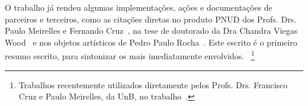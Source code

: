 \documentclass[a4paper, 11pt]{article} %
\begin{document}
O trabalho já rendeu algumas implementações, ações e documentações de parceiros e terceiros, como as citações diretas no produto PNUD dos Profs. Drs. Paulo Meirelles e Fernando Cruz~\cite{paulo6}, na tese de doutorado da Dra Chandra Viegas Wood~\cite{chandra} e nos objetos artísticos de Pedro Paulo Rocha~\cite{pedro}. Este escrito é o primeiro resumo escrito, para sintonizar os mais imediatamente envolvidos.
~\footnote{Trabalhos recentemente utilizados diretamente pelos Profs. Drs. Francisco Cruz e Paulo Meirelles, da UnB, no trabalho~\cite{paulo6}.}

%



\end{document}
